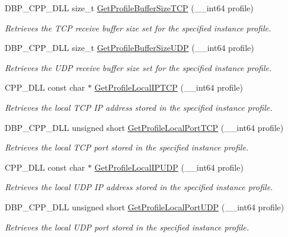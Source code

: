 \begin{DoxyCompactItemize}
DBP\_\-CPP\_\-DLL size\_\-t \hyperlink{namespacemn_a638da78b6da3fa2b3f1e9c89ad20233b}{GetProfileBufferSizeTCP} (\_\-\_\-int64 profile)
\begin{DoxyCompactList}\small\item\em Retrieves the TCP receive buffer size set for the specified instance profile. \item\end{DoxyCompactList}\item 
DBP\_\-CPP\_\-DLL size\_\-t \hyperlink{namespacemn_a544aa1d33e22e88c562cca5c0024ab1f}{GetProfileBufferSizeUDP} (\_\-\_\-int64 profile)
\begin{DoxyCompactList}\small\item\em Retrieves the UDP receive buffer size set for the specified instance profile. \item\end{DoxyCompactList}\item 
CPP\_\-DLL const char $\ast$ \hyperlink{namespacemn_a523d1b974c9785f00f2e7f5b26c5c2c2}{GetProfileLocalIPTCP} (\_\-\_\-int64 profile)
\begin{DoxyCompactList}\small\item\em Retrieves the local TCP IP address stored in the specified instance profile. \item\end{DoxyCompactList}\item 
DBP\_\-CPP\_\-DLL unsigned short \hyperlink{namespacemn_a689199a271d286090871df67a789b6df}{GetProfileLocalPortTCP} (\_\-\_\-int64 profile)
\begin{DoxyCompactList}\small\item\em Retrieves the local TCP port stored in the specified instance profile. \item\end{DoxyCompactList}\item 
CPP\_\-DLL const char $\ast$ \hyperlink{namespacemn_aacce68da4e111d9e4633612660ed4b07}{GetProfileLocalIPUDP} (\_\-\_\-int64 profile)
\begin{DoxyCompactList}\small\item\em Retrieves the local UDP IP address stored in the specified instance profile. \item\end{DoxyCompactList}\item 
DBP\_\-CPP\_\-DLL unsigned short \hyperlink{namespacemn_a465182dbc176f30ec2e46a0a700a69ea}{GetProfileLocalPortUDP} (\_\-\_\-int64 profile)
\begin{DoxyCompactList}\small\item\em Retrieves the local UDP port stored in the specified instance profile. \item\end{DoxyCompactList}\item 

\end{DoxyCompactItemize}

